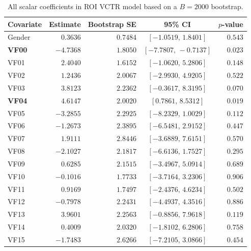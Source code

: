 \documentclass[10pt]{notes}
\begin{document}
\clearpage

\begin{landscape}
\begin{table}[p]
    \centering
    \setlength{\tabcolsep}{3.5pt}
    \renewcommand{\arraystretch}{1.02}
    \caption{All scalar coefficients in ROI VCTR model based
    on a $B=2000$ bootstrap.}
    \label{tab:roi-beta-table}
    \label{tab:grape-roi-xz-beta}
    \begin{minipage}[t]{0.49\linewidth}
    \centering
    \begin{tabular}{lrrcr}
    \hline
    Covariate & Estimate & Bootstrap SE & 95\% CI & $p$-value \\
    \hline
    Gender & $0.3636$ & $0.7484$ & $[-1.0519,\,1.8401]$ & $0.543$ \\
    \textbf{VF00} & $\mathbf{-4.7368}$ & $\mathbf{1.8050}$ & $\mathbf{[-7.7807,\,-0.7137]}$ & $\mathbf{0.023}$ \\
    VF01 & $2.4040$ & $1.6152$ & $[-1.0620,\,5.2806]$ & $0.148$ \\
    VF02 & $1.2436$ & $2.0067$ & $[-2.9930,\,4.9205]$ & $0.522$ \\
    VF03 & $3.8123$ & $2.2362$ & $[-0.3617,\,8.3195]$ & $0.070$ \\
    \textbf{VF04} & $\mathbf{4.6147}$ & $\mathbf{2.0020}$ & $\mathbf{[0.7861,\,8.5312]}$ & $\mathbf{0.019}$ \\
    VF05 & $-3.2855$ & $2.2925$ & $[-8.2329,\,1.0029]$ & $0.112$ \\
    VF06 & $-1.2673$ & $2.3895$ & $[-6.5481,\,2.9152]$ & $0.447$ \\
    VF07 & $1.9111$ & $2.8446$ & $[-3.6889,\,7.6151]$ & $0.570$ \\
    VF08 & $-2.1027$ & $2.1817$ & $[-6.6136,\,1.7527]$ & $0.295$ \\
    VF09 & $0.6285$ & $2.1515$ & $[-3.4967,\,5.0914]$ & $0.689$ \\
    VF10 & $-0.1016$ & $1.7733$ & $[-3.7164,\,3.2306]$ & $0.906$ \\
    VF11 & $0.9169$ & $1.7497$ & $[-2.4376,\,4.6234]$ & $0.502$ \\
    VF12 & $-0.7978$ & $2.2431$ & $[-4.4937,\,4.3516]$ & $0.886$ \\
    VF13 & $3.9601$ & $2.2563$ & $[-0.8856,\,7.9618]$ & $0.119$ \\
    VF14 & $0.4009$ & $2.0320$ & $[-1.8102,\,6.2806]$ & $0.758$ \\
    VF15 & $-1.7483$ & $2.6266$ & $[-7.2105,\,3.0866]$ & $0.454$ \\

\end{tabular}
\end{minipage}
\end{table}
\end{landscape}
\end{document}
